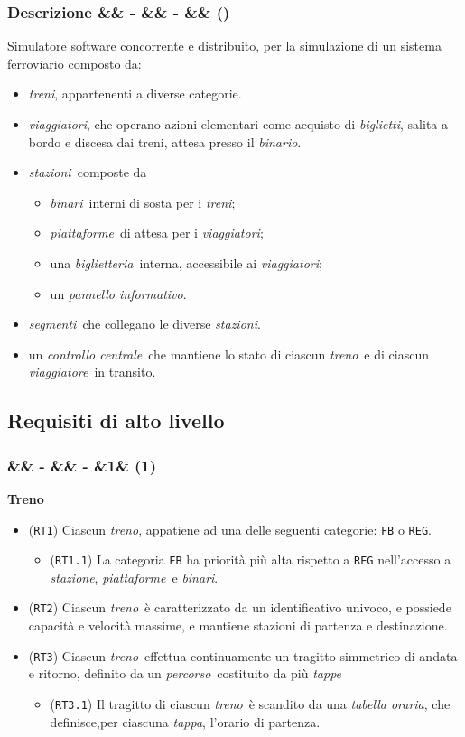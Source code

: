 \documentclass[slidestop,compress,blackandwhite]{beamer}
\newcommand{\ttt}[1]{\texttt{#1}}
\newcommand{\ii}[1]{\textit{#1}}
\newcommand{\treno}{\ii{treno}}
\newcommand{\treni}{\ii{treni}}
\newcommand{\viaggiatore}{\ii{viaggiatore}}
\newcommand{\viaggiatori}{\ii{viaggiatori}}
\newcommand{\stazione}{\ii{stazione}}
\newcommand{\stazioni}{\ii{stazioni}}
\newcommand{\piattaforme}{\ii{piattaforme}}
\newcommand{\binario}{\ii{binario}}
\newcommand{\binari}{\ii{binari}}
\newcommand{\tickets}{\ii{biglietti}}
\newcommand{\segmenti}{\ii{segmenti}}
\newcommand{\route}{\ii{percorso}}
\newcommand{\stage}{\ii{tappa}}
\newcommand{\stages}{\ii{tappe}}
\newcommand{\biglietteria}{\ii{biglietteria}}
\newcommand{\timetable}{\ii{tabella oraria}}
\newcommand{\controller}{\ii{controllo centrale}}
\newcommand{\newtitle}[4]{
	#1 
	\ifx&#2&%
	\else
  		\large- #2
	\fi
	\ifx&#3&%
	\else
  		\normalsize- #3
	\fi
	\ifx&#4&%
	\else
  		\normalsize (#4)
	\fi
}
\newcommand{\newframe}[5]{
	\begin{frame}
		\frametitle{\newtitle{#1}{#2}{#3}{#4}}
		#5
	\end{frame}
}
\newcommand{\itemt}[1]{\item (\ttt{#1})}
\begin{document}
	\newframe{Descrizione}{}{}{}{
		Simulatore software concorrente e distribuito, per la simulazione di un sistema ferroviario composto da:
		\begin{itemize}
			\item \treni, appartenenti a diverse categorie.
			\item \viaggiatori, che operano azioni elementari come acquisto di \tickets, salita a bordo e discesa dai treni, attesa presso il \binario.
			\item \stazioni~composte da 
				\begin{itemize}
					\item \binari~interni di sosta per i \treni;
					\item \piattaforme~di attesa per i \viaggiatori;
					\item una \biglietteria~interna, accessibile ai \viaggiatori;
					\item un \ii{pannello informativo}.
				\end{itemize}
			\item \segmenti~che collegano le diverse \stazioni.
			\item un \controller~che mantiene lo stato di ciascun \treno~e di ciascun \viaggiatore~in transito.
		\end{itemize}
	}
	
	\subsection{Requisiti di alto livello}\label{requirements}
	
	\newframe{}{}{}{1}{
		\textbf{Treno}
		\begin{itemize}
			\itemt{RT1} Ciascun \treno, appatiene ad una delle seguenti categorie: \ttt{FB} o \ttt{REG}.
				\begin{itemize}
					\itemt{RT1.1} La categoria \ttt{FB} ha priorità più alta rispetto a \ttt{REG} nell'accesso a \stazione, \piattaforme~e \binari.
				\end{itemize}
			\itemt{RT2} Ciascun \treno~è caratterizzato da un identificativo univoco, e possiede capacità e velocità massime, e mantiene stazioni di partenza e destinazione.
			\itemt{RT3} Ciascun \treno~effettua continuamente un tragitto simmetrico di andata e ritorno, definito da un \route~costituito da più \stages
				\begin{itemize}
					\itemt{RT3.1} Il tragitto di ciascun \treno~è scandito da una \timetable, che definisce,per ciascuna \stage, l'orario di partenza.
				\end{itemize}
		\end{itemize}
	}
	
\end{document}
